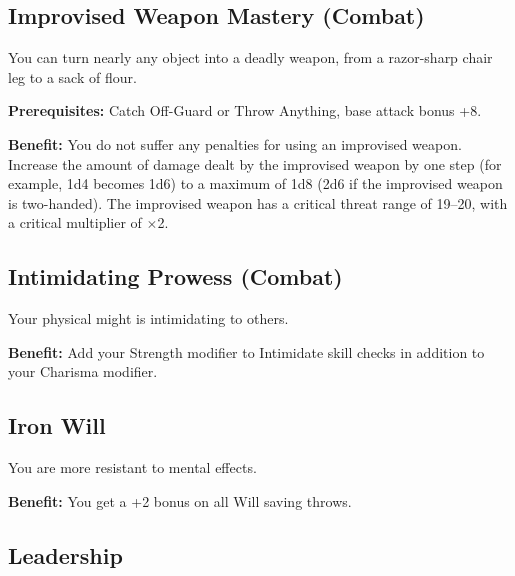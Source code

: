 \subsection{Improvised Weapon Mastery (Combat)}

				
You can turn nearly any object into a deadly weapon, from a razor-sharp chair leg to a sack of flour.
				
\textbf{Prerequisites:} Catch Off-Guard or Throw Anything, base attack bonus +8.
				
\textbf{Benefit:} You do not suffer any penalties for using an improvised weapon. Increase the amount of damage dealt by the improvised weapon by one step (for example, 1d4 becomes 1d6) to a maximum of 1d8 (2d6 if the improvised weapon is two-handed). The improvised weapon has a critical threat range of 19--20, with a critical multiplier of \mbox{$\times$}2.
				
\subsection{Intimidating Prowess (Combat)}

				
Your physical might is intimidating to others.
				
\textbf{Benefit:} Add your Strength modifier to Intimidate skill checks in addition to your Charisma modifier.
				
\subsection{Iron Will}

				
You are more resistant to mental effects.
				
\textbf{Benefit:} You get a +2 bonus on all Will saving throws.
				
\subsection{Leadership}

